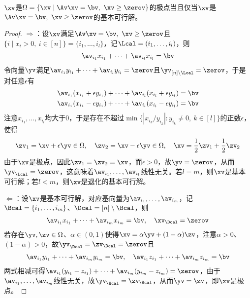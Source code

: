 \documentclass{ctexart}
\begin{document}
\begin{theorem} [等价性]
    $\xv$是$\Omega = \{ \xv \mid \Av \xv = \bv, ~ \xv \ge \zerov \}$的极点当且仅当$\xv$是$\Av \xv = \bv, ~ \xv \ge \zerov$的基本可行解。
\end{theorem}

\begin{proof}
    $\Rightarrow$：设$\xv$满足$\Av \xv = \bv, ~ \xv \ge \zerov$且$\{ i \mid x_i > 0, ~ i \in [n] \} = \{ i_1, \ldots, i_l \}$，记$\Lcal = (i_1, \ldots, i_l)$，则
    \begin{align*}
        \av_{i_1} x_{i_1} + \cdots + \av_{i_l} x_{i_l} = \bv
    \end{align*}
    令向量$\yv$满足$\av_{i_1} y_{i_1} + \cdots + \av_{i_l} y_{i_l} = \zerov$且$\yv_{[n]\setminus \Lcal} = \zerov$，于是对任意$\epsilon$有
    \begin{align*}
        \av_{i_1} (x_{i_1} + \epsilon y_{i_1}) + \cdots + \av_{i_l} (x_{i_l} + \epsilon y_{i_l}) & = \bv \\
        \av_{i_1} (x_{i_1} - \epsilon y_{i_1}) + \cdots + \av_{i_l} (x_{i_l} - \epsilon y_{i_l}) & = \bv
    \end{align*}
    注意$x_{i_1}, \ldots, x_{i_l}$均大于$0$，于是存在不超过$\min\{ | x_{i_k} / y_{i_k} | : y_{i_k} \ne 0, ~ k \in [l] \}$的正数$\epsilon$，使得
    \begin{align*}
        \zv_1 = \xv + \epsilon \yv \in \Omega, \quad \zv_2 = \xv - \epsilon \yv \in \Omega, \quad \xv = \frac{1}{2} \zv_1 + \frac{1}{2} \zv_2
    \end{align*}
    由于$\xv$是极点，因此$\zv_1 = \zv_2 = \xv$，而$\epsilon > 0$，故$\yv = \zerov$，从而$\yv_\Lcal = \zerov$，这意味着$\av_{i_1}, \ldots, \av_{i_l}$线性无关。若$l = m$，则$\xv$是基本可行解；若$l < m$，则$\xv$是退化的基本可行解。

    $\Leftarrow$：设$\xv$是基本可行解，对应基向量为$\av_{i_1}, \ldots, \av_{i_m}$，记$\Bcal = \{i_1, \ldots, i_m\}$、$\Dcal = [n] \setminus \Bcal$，则
    \begin{align*}
        \av_{i_1} x_{i_1} + \cdots + \av_{i_m} x_{i_m} = \bv, \quad \xv_\Dcal = \zerov
    \end{align*}
    若存在$\yv, \zv \in \Omega$、$\alpha \in (0,1)$使得$\xv = \alpha \yv + (1 - \alpha)\zv$，注意$\alpha > 0$、$(1- \alpha) > 0$，故$\yv_\Dcal = \zv_\Dcal = \zerov$且
    \begin{align*}
        \av_{i_1} y_{i_1} + \cdots + \av_{i_m} y_{i_m} = \bv, \quad \av_{i_1} z_{i_1} + \cdots + \av_{i_m} z_{i_m} = \bv
    \end{align*}
    两式相减可得$\av_{i_1} (y_{i_1} - z_{i_1}) + \cdots + \av_{i_m} (y_{i_m} - z_{i_m}) = \zerov$，由于$\av_{i_1}, \ldots, \av_{i_m}$线性无关，故$\yv_\Bcal = \zv_\Bcal$，从而$\yv = \zv$，即$\xv$是极点。
\end{proof}
\end{document}
